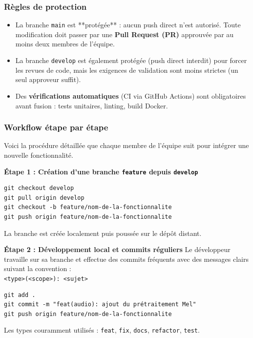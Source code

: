 \documentclass[11pt,a4paper]{article}
\begin{document}
\subsubsection{Règles de protection}
\begin{itemize}
    \item La branche \texttt{main} est **protégée** : aucun push direct n’est autorisé. Toute modification doit passer par une \textbf{Pull Request (PR)} approuvée par au moins deux membres de l’équipe.
    \item La branche \texttt{develop} est également protégée (push direct interdit) pour forcer les revues de code, mais les exigences de validation sont moins strictes (un seul approveur suffit).
    \item Des \textbf{vérifications automatiques} (CI via GitHub Actions) sont obligatoires avant fusion : tests unitaires, linting, build Docker.
\end{itemize}

\subsubsection{Workflow étape par étape}

Voici la procédure détaillée que chaque membre de l’équipe suit pour intégrer une nouvelle fonctionnalité.

\begin{etapebox}
\textbf{Étape 1 : Création d’une branche \texttt{feature} depuis \texttt{develop}}
\begin{verbatim}
git checkout develop
git pull origin develop
git checkout -b feature/nom-de-la-fonctionnalite
git push origin feature/nom-de-la-fonctionnalite
\end{verbatim}
La branche est créée localement puis poussée sur le dépôt distant.
\end{etapebox}

\begin{etapebox}
\textbf{Étape 2 : Développement local et commits réguliers}
Le développeur travaille sur sa branche et effectue des commits fréquents avec des messages clairs suivant la convention :\\
\texttt{<type>(<scope>): <sujet>}
\begin{verbatim}
git add .
git commit -m "feat(audio): ajout du prétraitement Mel"
git push origin feature/nom-de-la-fonctionnalite
\end{verbatim}
Les types couramment utilisés : \texttt{feat}, \texttt{fix}, \texttt{docs}, \texttt{refactor}, \texttt{test}.
\end{etapebox}
\end{document}
